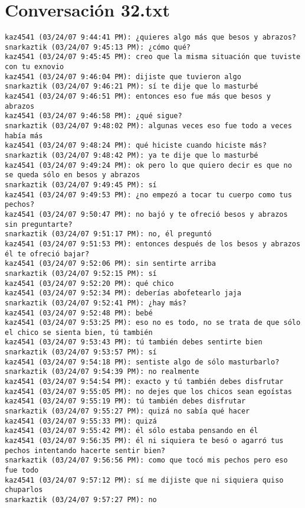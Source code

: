 \section{Conversaci\'on 32.txt}

\begin{verbatim}
kaz4541 (03/24/07 9:44:41 PM): ¿quieres algo más que besos y abrazos?
snarkaztik (03/24/07 9:45:13 PM): ¿cómo qué?
kaz4541 (03/24/07 9:45:45 PM): creo que la misma situación que tuviste con tu exnovio
kaz4541 (03/24/07 9:46:04 PM): dijiste que tuvieron algo
snarkaztik (03/24/07 9:46:21 PM): sí te dije que lo masturbé
kaz4541 (03/24/07 9:46:51 PM): entonces eso fue más que besos y abrazos
kaz4541 (03/24/07 9:46:58 PM): ¿qué sigue?
snarkaztik (03/24/07 9:48:02 PM): algunas veces eso fue todo a veces había más
kaz4541 (03/24/07 9:48:24 PM): qué hiciste cuando hiciste más?
snarkaztik (03/24/07 9:48:42 PM): ya te dije que lo masturbé
kaz4541 (03/24/07 9:49:24 PM): ok pero lo que quiero decir es que no se queda sólo en besos y abrazos
snarkaztik (03/24/07 9:49:45 PM): sí
kaz4541 (03/24/07 9:49:53 PM): ¿no empezó a tocar tu cuerpo como tus pechos?
kaz4541 (03/24/07 9:50:47 PM): no bajó y te ofreció besos y abrazos sin preguntarte?
snarkaztik (03/24/07 9:51:17 PM): no, él preguntó
kaz4541 (03/24/07 9:51:53 PM): entonces después de los besos y abrazos él te ofreció bajar?
kaz4541 (03/24/07 9:52:06 PM): sin sentirte arriba
snarkaztik (03/24/07 9:52:15 PM): sí
kaz4541 (03/24/07 9:52:20 PM): qué chico
kaz4541 (03/24/07 9:52:34 PM): deberías abofetearlo jaja
snarkaztik (03/24/07 9:52:41 PM): ¿hay más?
kaz4541 (03/24/07 9:52:48 PM): bebé
kaz4541 (03/24/07 9:53:25 PM): eso no es todo, no se trata de que sólo el chico se sienta bien, tú también
kaz4541 (03/24/07 9:53:43 PM): tú también debes sentirte bien
snarkaztik (03/24/07 9:53:57 PM): sí
kaz4541 (03/24/07 9:54:18 PM): sentiste algo de sólo masturbarlo?
snarkaztik (03/24/07 9:54:39 PM): no realmente
kaz4541 (03/24/07 9:54:54 PM): exacto y tú también debes disfrutar
kaz4541 (03/24/07 9:55:05 PM): no dejes que los chicos sean egoístas
kaz4541 (03/24/07 9:55:19 PM): tú también debes disfrutar
snarkaztik (03/24/07 9:55:27 PM): quizá no sabía qué hacer
kaz4541 (03/24/07 9:55:33 PM): quizá
kaz4541 (03/24/07 9:55:42 PM): él sólo estaba pensando en él
kaz4541 (03/24/07 9:56:35 PM): él ni siquiera te besó o agarró tus pechos intentando hacerte sentir bien?
snarkaztik (03/24/07 9:56:56 PM): como que tocó mis pechos pero eso fue todo
kaz4541 (03/24/07 9:57:12 PM): sí me dijiste que ni siquiera quiso chuparlos
snarkaztik (03/24/07 9:57:27 PM): no

\end{verbatim}
